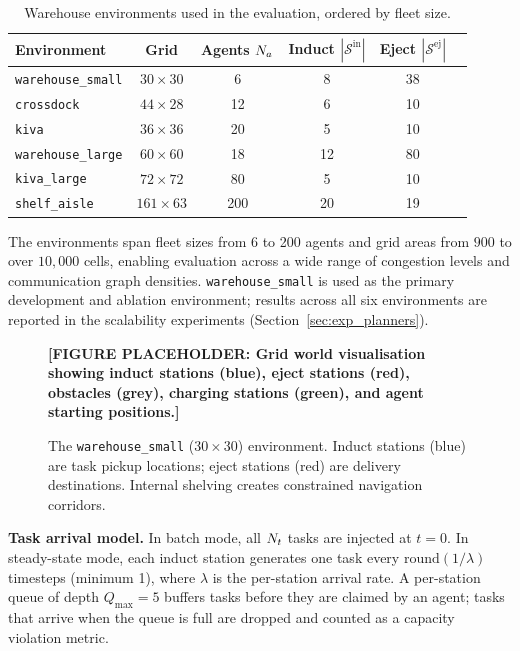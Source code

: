 \begin{table}[htbp]
  \centering
  \caption{Warehouse environments used in the evaluation, ordered by fleet size.}
  \label{tab:environments}
  \small
  \begin{tabular}{lccccc}
    \toprule
    \textbf{Environment} & \textbf{Grid} & \textbf{Agents} $N_a$ &
    \textbf{Induct} $|\mathcal{S}^{\text{in}}|$ &
    \textbf{Eject} $|\mathcal{S}^{\text{ej}}|$ \\
    \midrule
    \texttt{warehouse\_small}  & $30\times30$   & 6   & 8  & 38 \\
    \texttt{crossdock}         & $44\times28$   & 12  & 6  & 10 \\
    \texttt{kiva}              & $36\times36$   & 20  & 5  & 10 \\
    \texttt{warehouse\_large}  & $60\times60$   & 18  & 12 & 80 \\
    \texttt{kiva\_large}       & $72\times72$   & 80  & 5  & 10 \\
    \texttt{shelf\_aisle}      & $161\times63$  & 200 & 20 & 19 \\
    \bottomrule
  \end{tabular}
\end{table}

The environments span fleet sizes from 6 to 200 agents and grid areas from
$900$ to over $10{,}000$ cells, enabling evaluation across a wide range of
congestion levels and communication graph densities.
\texttt{warehouse\_small} is used as the primary development and ablation
environment; results across all six environments are reported in the
scalability experiments (Section~\ref{sec:exp_planners}).

\begin{figure}[htbp]
  \centering
  \textbf{[FIGURE PLACEHOLDER: Grid world visualisation showing induct stations (blue),
  eject stations (red), obstacles (grey), charging stations (green), and
  agent starting positions.]}
  \caption{The \texttt{warehouse\_small} ($30 \times 30$) environment.
           Induct stations (blue) are task pickup locations; eject stations
           (red) are delivery destinations. Internal shelving creates
           constrained navigation corridors.}
  \label{fig:gridworld}
\end{figure}

\textbf{Task arrival model.}
In batch mode, all $N_t$ tasks are injected at $t = 0$.
In steady-state mode, each induct station generates one task every
$\text{round}(1/\lambda)$ timesteps (minimum 1), where $\lambda$ is the
per-station arrival rate.
A per-station queue of depth $Q_{\max} = 5$ buffers tasks before they are
claimed by an agent; tasks that arrive when the queue is full are dropped and
counted as a capacity violation metric.

